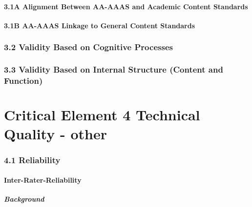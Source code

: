 \documentclass[]{book}
\let\oldparagraph\paragraph
\renewcommand{\paragraph}[1]{\oldparagraph{#1}\mbox{}}
\begin{document}
\hypertarget{a-alignment-between-aa-aaas-and-academic-content-standards}{%
\subsubsection{3.1A Alignment Between AA-AAAS and Academic Content Standards}\label{a-alignment-between-aa-aaas-and-academic-content-standards}}

\hypertarget{b-aa-aaas-linkage-to-general-content-standards}{%
\subsubsection{3.1B AA-AAAS Linkage to General Content Standards}\label{b-aa-aaas-linkage-to-general-content-standards}}

\hypertarget{validity-based-on-cognitive-processes}{%
\subsection{3.2 Validity Based on Cognitive Processes}\label{validity-based-on-cognitive-processes}}

\hypertarget{validity-based-on-internal-structure-content-and-function}{%
\subsection{3.3 Validity Based on Internal Structure (Content and Function)}\label{validity-based-on-internal-structure-content-and-function}}

\hypertarget{critical-element-4-technical-quality---other}{%
\chapter{Critical Element 4 Technical Quality - other}\label{critical-element-4-technical-quality---other}}

\hypertarget{reliability}{%
\subsection{4.1 Reliability}\label{reliability}}

\hypertarget{inter-rater-reliability}{%
\subsubsection{Inter-Rater-Reliability}\label{inter-rater-reliability}}

\hypertarget{background}{%
\paragraph{Background}\label{background}}
\end{document}

